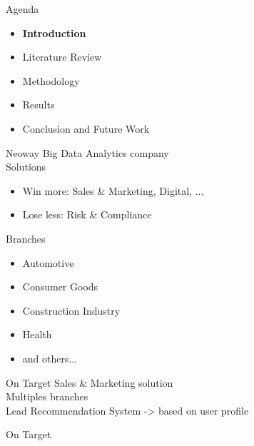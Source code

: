 \begin{frame}{Agenda}
\begin{itemize}
    \item \textbf{Introduction}
    \item Literature Review
    \item Methodology
    \item Results
    \item Conclusion and Future Work
\end{itemize}
\end{frame}

%

\begin{frame}{Neoway} \pause
    Big Data Analytics company\\ \pause
    \vspace{0.5cm}
    Solutions \pause
    \begin{itemize}
        \item Win more: Sales \& Marketing, Digital, ... \pause
        \item Lose less: Risk \& Compliance \pause
    \end{itemize}
    \vspace{0.5cm}
    Branches \pause
    \begin{itemize}
        \item Automotive \pause
        \item Consumer Goods \pause
        \item Construction Industry \pause
        \item Health \pause
        \item and others...
    \end{itemize} 
\end{frame}


\begin{frame}{On Target} \pause
    Sales \& Marketing solution\\  \pause
    \vspace{0.5cm}
    Multiples branches \\  \pause
    \vspace{0.5cm}
    Lead Recommendation System \pause
    -> based on user profile
    \vspace{0.5cm}
\end{frame}


\begin{frame}{On Target}
\end{frame}

